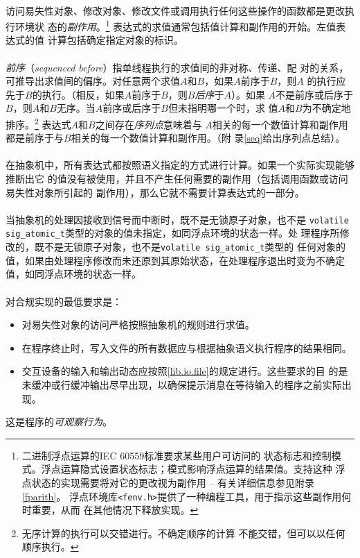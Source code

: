 \paragraph{}
访问易失性对象、修改对象、修改文件或调用执行任何这些操作的函数都是更改执行环境状
态的\textit{副作用}。\footnote{二进制浮点运算的IEC 60559标准要求某些用户可访问的
状态标志和控制模式。浮点运算隐式设置状态标志；模式影响浮点运算的结果值。支持这种
浮点状态的实现需要将对它的更改视为副作用 -- 有关详细信息参见附录\ref{fparith}。
浮点环境库\texttt{<fenv.h>}提供了一种编程工具，用于指示这些副作用何时重要，从而
在其他情况下释放实现。} 表达式的求值通常包括值计算和副作用的开始。左值表达式的值
计算包括确定指定对象的标识。

\paragraph{}
\textit{前序}（\textit{sequenced before}）指单线程执行的求值间的非对称、传递、配
对的关系，可推导出求值间的偏序。对任意两个求值$A$和$B$，如果$A$前序于$B$，则$A$
的执行应先于$B$的执行。（相反，如果$A$前序于$B$，则$B$\textit{后序}于$A$）。如果
$A$不是前序或后序于$B$，则$A$和$B$无序。当$A$前序或后序于$B$但未指明哪一个时，求
值$A$和$B$为不确定地排序。\footnote{无序计算的执行可以交错进行。不确定顺序的计算
不能交错，但可以以任何顺序执行。} 表达式$A$和$B$之间存在\textit{序列点}意味着与
$A$相关的每一个数值计算和副作用都是前序于与$B$相关的每一个数值计算和副作用。（附
录\ref{seq}给出序列点总结）。

\paragraph{}
在抽象机中，所有表达式都按照语义指定的方式进行计算。如果一个实际实现能够推断出它
的值没有被使用，并且不产生任何需要的副作用（包括调用函数或访问易失性对象所引起的
副作用），那么它就不需要计算表达式的一部分。

\paragraph{}
当抽象机的处理因接收到信号而中断时，既不是无锁原子对象，也不是
\texttt{volatile sig\_atomic\_t}类型的对象的值未指定，如同浮点环境的状态一样。处
理程序所修改的，既不是无锁原子对象，也不是\texttt{volatile sig\_atomic\_t}类型的
任何对象的值，如果由处理程序修改而未还原到其原始状态，在处理程序退出时变为不确定
值，如同浮点环境的状态一样。

\paragraph{}
对合规实现的最低要求是：
\begin{itemize}
  \item{对易失性对象的访问严格按照抽象机的规则进行求值。}
  \item{在程序终止时，写入文件的所有数据应与根据抽象语义执行程序的结果相同。}
  \item{交互设备的输入和输出动态应按照\ref{lib.io.file}的规定进行。这些要求的目
  的是未缓冲或行缓冲输出尽早出现，以确保提示消息在等待输入的程序之前实际出现。}
\end{itemize}
这是程序的\textit{可观察行为}。

